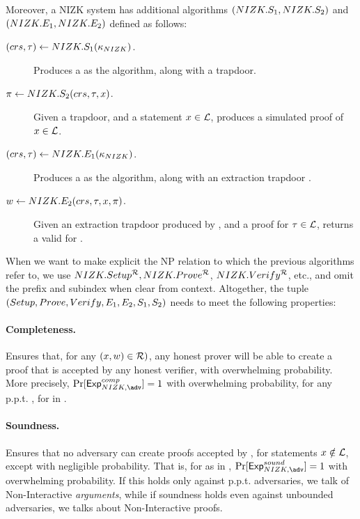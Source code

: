 Moreover, a NIZK system has additional algorithms $(NIZK.S_1,NIZK.S_2)$ and
$(NIZK.E_1,NIZK.E_2)$ defined as follows:

\begin{description}
\item[$(crs,\tau) \gets NIZK.S_1(\kappa_{NIZK})$.] Produces a \NIZKcrs
  as the \NIZKSetup algorithm, along with a  trapdoor.
\item[$\pi \gets NIZK.S_2(crs,\tau,x)$.] Given a
   trapdoor, and a statement $x \in \mathcal{L}$,
  produces a simulated proof \NIZKproof of $x \in \mathcal{L}$.
\item[$(crs,\tau) \gets NIZK.E_1(\kappa_{NIZK})$.] Produces a \NIZKcrs
  as the \NIZKSetup algorithm, along with an extraction trapdoor \NIZKext.
\item[$w \gets NIZK.E_2(crs,\tau,x,\pi)$.] Given
  an extraction trapdoor \NIZKext produced by \NIZKExtI, and a proof \NIZKproof
  for $\tau \in \mathcal{L}$, returns a valid \NIZKw for \NIZKx.
\end{description}

When we want to make explicit the NP relation \NIZKRel to which the previous
algorithms refer to, we use $NIZK.Setup^\mathcal{R},NIZK.Prove^\mathcal{R}$, 
$NIZK.Verify^\mathcal{R}$, etc., and omit the \NIZK prefix and subindex when clear
from context. Altogether, the tuple $(Setup,Prove,Verify,E_1,E_2,S_1,
S_2)$ needs to meet the following properties:

\paragraph{Completeness.} %
Ensures that, for any $(x,w) \in \mathcal{R})$, any honest prover will be
able to create a proof \NIZKproof that is accepted by any honest verifier, with
overwhelming probability. More precisely, $\Pr\lbrack\ExpNIZKComp\rbrack = 1$
with overwhelming probability, for any p.p.t. \adv, for \ExpNIZKComp in
.

\paragraph{Soundness.} %
Ensures that no adversary can create proofs accepted by \Verify, for
statements $x \notin \mathcal{L}$, except with negligible probability. That
is, for \ExpNIZKSound as in , $\Pr\lbrack\ExpNIZKSound\rbrack
= 1$ with overwhelming probability. If this holds only against p.p.t.
adversaries, we talk of Non-Interactive \emph{arguments}, while if soundness
holds even against unbounded adversaries, we talks about Non-Interactive proofs.

